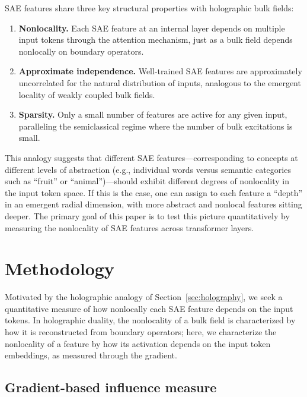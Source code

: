 \documentclass{article}
\begin{document}
SAE features share three key structural properties with holographic bulk
fields:
\begin{enumerate}
    \item \textbf{Nonlocality.} Each SAE feature at an internal layer
          depends on multiple input tokens through the attention mechanism,
          just as a bulk field depends nonlocally on boundary operators.
    \item \textbf{Approximate independence.} Well-trained SAE features are
          approximately uncorrelated for the natural distribution of inputs,
          analogous to the emergent locality of weakly coupled bulk fields.
    \item \textbf{Sparsity.} Only a small number of features are active for
          any given input, paralleling the semiclassical regime where the
          number of bulk excitations is small.
\end{enumerate}

This analogy suggests that different SAE features---corresponding to
concepts at different levels of abstraction (e.g., individual words versus
semantic categories such as ``fruit'' or ``animal'')---should exhibit
different degrees of nonlocality in the input token space. If this is the
case, one can assign to each feature a ``depth'' in an emergent radial
dimension, with more abstract and nonlocal features sitting deeper. The
primary goal of this paper is to test this picture quantitatively by
measuring the nonlocality of SAE features across transformer layers.

\section{Methodology}
\label{sec:methodology}

Motivated by the holographic analogy of Section~\ref{sec:holography}, we
seek a quantitative measure of how nonlocally each SAE feature depends on
the input tokens. In holographic duality, the nonlocality of a bulk field
is characterized by how it is reconstructed from boundary operators; here,
we characterize the nonlocality of a feature by how its activation depends
on the input token embeddings, as measured through the gradient.

\subsection{Gradient-based influence measure}
\label{sec:influence}
\end{document}
